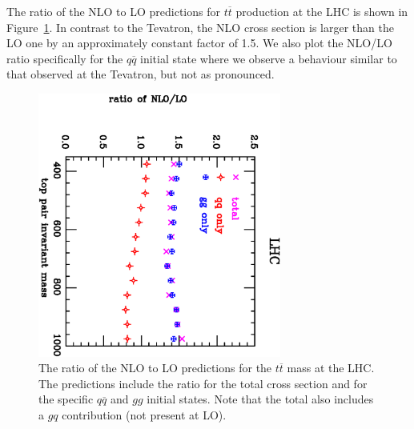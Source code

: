 \documentclass[12pt]{iopart}
\begin{document}
The ratio of the NLO to LO predictions for $t\overline{t}$ production at the LHC is shown in Figure~\ref{fig:mtt_ratio_lhc}. In contrast to the
Tevatron, the NLO cross section is larger than the LO one by an approximately constant factor of 1.5. We also plot the NLO/LO ratio specifically for
the $q\overline{q}$ initial state where we observe a behaviour similar to that observed at the Tevatron, but not as pronounced.
%
\begin{figure}[t]
\begin{center}
\includegraphics[width=8cm,angle=90]{mtt_ratio_lhc.ps}
\end{center}
\vspace*{-0.5cm}
\caption{
The ratio of the NLO to LO predictions for the $t\overline{t}$ mass at the LHC.
The predictions include the ratio for the total cross section and for the
specific $q\overline{q}$ and $gg$ initial states. Note that the total also includes a $gq$ contribution
(not present at LO).  
\label{fig:mtt_ratio_lhc}}
\end{figure}
%
\end{document}
